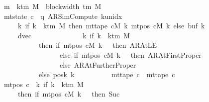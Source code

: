 \begin{isabellebody}
\ \ \ \ \ \ \ \ \ {\isasymand}\ m\ {\isasymle}\ k{\isacharunderscore}{\kern0pt}tm\ M\ {\isacharasterisk}{\kern0pt}\ {\isacharparenleft}{\kern0pt}block{\isacharunderscore}{\kern0pt}width\ {\isacharparenleft}{\kern0pt}{\isasymGamma}{\isacharunderscore}{\kern0pt}tm\ M{\isacharparenright}{\kern0pt}\ {\isacharplus}{\kern0pt}\ {}{\isacharparenright}{\kern0pt}\isanewline
\ \ \ \ \ \ \ \ \ {\isasymand}\ mt{\isacharunderscore}{\kern0pt}state\ c\ {\isacharequal}{\kern0pt}\ {\isacharparenleft}{\kern0pt}q{\isacharcomma}{\kern0pt}\ AR{\isacharunderscore}{\kern0pt}SimCompute{\isacharcomma}{\kern0pt}\ k{\isacharunderscore}{\kern0pt}unidx\ {}{\isacharcomma}{\kern0pt}\ {}{\isacharcomma}{\kern0pt}\isanewline
\ \ \ \ \ \ \ \ \ \ \ \ \ \ {\isacharparenleft}{\kern0pt}{\isasymlambda}k{\isachardot}{\kern0pt}\ if\ k\ {\isacharless}{\kern0pt}\ k{\isacharunderscore}{\kern0pt}tm\ M\ then\ mt{\isacharunderscore}{\kern0pt}tape\ cM\ k\ {\isacharparenleft}{\kern0pt}mt{\isacharunderscore}{\kern0pt}pos\ cM\ k{\isacharparenright}{\kern0pt}\ else\ buf{}\ k{\isacharparenright}{\kern0pt}{\isacharcomma}{\kern0pt}\isanewline
\ \ \ \ \ \ \ \ \ \ \ \ \ \ dvec{\isacharcomma}{\kern0pt}\isanewline
\ \ \ \ \ \ \ \ \ \ \ \ \ \ {\isacharparenleft}{\kern0pt}{\isasymlambda}k{\isachardot}{\kern0pt}\ if\ k\ {\isacharless}{\kern0pt}\ k{\isacharunderscore}{\kern0pt}tm\ M\isanewline
\ \ \ \ \ \ \ \ \ \ \ \ \ \ \ \ \ \ \ \ then\ {\isacharparenleft}{\kern0pt}if\ mt{\isacharunderscore}{\kern0pt}pos\ cM\ k\ {\isacharequal}{\kern0pt}\ {}\ then\ AR{\isacharunderscore}{\kern0pt}AtLE\isanewline
\ \ \ \ \ \ \ \ \ \ \ \ \ \ \ \ \ \ \ \ \ \ \ \ \ \ else\ if\ mt{\isacharunderscore}{\kern0pt}pos\ cM\ k\ {\isacharequal}{\kern0pt}\ {}\ then\ AR{\isacharunderscore}{\kern0pt}AtFirstProper\isanewline
\ \ \ \ \ \ \ \ \ \ \ \ \ \ \ \ \ \ \ \ \ \ \ \ \ \ else\ AR{\isacharunderscore}{\kern0pt}AtFurtherProper{\isacharparenright}{\kern0pt}\isanewline
\ \ \ \ \ \ \ \ \ \ \ \ \ \ \ \ \ \ \ \ else\ posk{}\ k{\isacharparenright}{\kern0pt}{\isacharparenright}{\kern0pt}\isanewline
\ \ \ \ \ \ \ \ \ {\isasymand}\ mt{\isacharunderscore}{\kern0pt}tape\ c\ {\isacharequal}{\kern0pt}\ mt{\isacharunderscore}{\kern0pt}tape\ c{}\isanewline
\ \ \ \ \ \ \ \ \ {\isasymand}\ mt{\isacharunderscore}{\kern0pt}pos\ c\ {\isacharequal}{\kern0pt}\ {\isacharparenleft}{\kern0pt}{\isasymlambda}k{\isachardot}{\kern0pt}\ if\ k\ {\isacharless}{\kern0pt}\ k{\isacharunderscore}{\kern0pt}tm\ M\isanewline
\ \ \ \ \ \ \ \ \ \ \ \ \ \ then\ {\isacharparenleft}{\kern0pt}if\ mt{\isacharunderscore}{\kern0pt}pos\ cM\ k\ {\isacharequal}{\kern0pt}\ {}\ then\ Suc\ {}\isanewline

\end{isabellebody}
